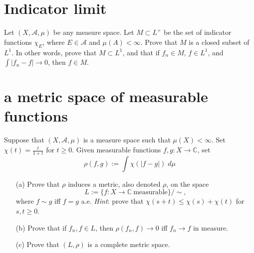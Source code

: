 \documentclass[lang=cn,11pt]{elegantbook}
\begin{document}
\section{Indicator limit}
  Let $(X,\mathcal{A},\mu)$ be any measure space. Let $M\subset L^+$ be the set of indicator functions $\chi_E$, where $E\in\mathcal{A}$ and $\mu(A)<\infty$. Prove that $M$ is a closed subset of $L^1$. In other words, prove that $M\subset L^1$, and that if $f_n\in M$, $f\in L^1$, and $\int|f_n-f|\to0$, then $f\in M$.







\section{a metric space of measurable functions}
  Suppose that $(X,\mathcal{A},\mu)$ is a measure space such that $\mu(X)<\infty$. Set $\chi(t)=\frac{t}{1+t}$ for $t\ge 0$.
  Given measurable functions $f,g\colon X\to\mathbb{C}$, set
  \[
    \rho(f,g):=\int\chi(|f-g|)\; d\mu
  \]
  \begin{itemize}
  \item[(a)]Prove that $\rho$ induces a metric, also denoted $\rho$, on the space \[
      L:=\{f\colon X\to\mathbb{C}\ \text{measurable}\}/\!\!\sim,
    \]
    where $f\sim g$ iff $f=g$ a.e. \textit{Hint}: prove that $\chi(s+t)\le\chi(s)+\chi(t)$ for $s,t\ge0$.
  \item[(b)]Prove that if $f_n,f\in L$, then $\rho(f_n,f)\to0$ iff $f_n\to f$ in measure.
  \item[(c)] Prove that $(L,\rho)$ is a complete metric space.
  \end{itemize}    
\end{document}
